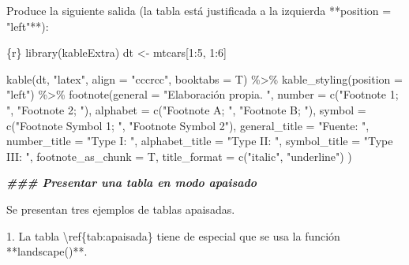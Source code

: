 \documentclass[11pt,a4paper,oneside,]{article}
\newenvironment{Shaded}{\begin{snugshade}}{\end{snugshade}}
\newcommand{\AttributeTok}[1]{\textcolor[rgb]{0.77,0.63,0.00}{#1}}
\newcommand{\DocumentationTok}[1]{\textcolor[rgb]{0.56,0.35,0.01}{\textbf{\textit{#1}}}}
\newcommand{\FloatTok}[1]{\textcolor[rgb]{0.00,0.00,0.81}{#1}}
\newcommand{\FunctionTok}[1]{\textcolor[rgb]{0.00,0.00,0.00}{#1}}
\newcommand{\NormalTok}[1]{#1}
\newcommand{\SpecialCharTok}[1]{\textcolor[rgb]{0.00,0.00,0.00}{#1}}
\newcommand{\StringTok}[1]{\textcolor[rgb]{0.31,0.60,0.02}{#1}}
\numberwithin{dummy}{section}
\theoremstyle{ocrenumbox}
\theoremstyle{blacknumex}
\theoremstyle{blacknumbox}
\theoremstyle{ocrenum}
\theoremstyle{ocrenum}
\begin{document}
\begin{Shaded}
\begin{Highlighting}[numbers=left,,]
\StringTok{\textasciigrave{}\textasciigrave{}\textasciigrave{}\textasciigrave{}}

\NormalTok{Produce la siguiente }\FunctionTok{salida}\NormalTok{ (la tabla está justificada a la izquierda }\SpecialCharTok{**}\StringTok{\textasciigrave{}}\AttributeTok{position = "left"}\StringTok{\textasciigrave{}}\SpecialCharTok{**}\NormalTok{)}\SpecialCharTok{:}

\StringTok{\textasciigrave{}\textasciigrave{}\textasciigrave{}}\AttributeTok{\{r\}}
\AttributeTok{library(kableExtra)}
\AttributeTok{dt \textless{}{-} mtcars[1:5, 1:6]}

\AttributeTok{kable(dt, "latex", align = "cccrcc", booktabs = T) \%\textgreater{}\%}
\AttributeTok{    kable\_styling(position = "left") \%\textgreater{}\% }
\AttributeTok{    footnote(general = "Elaboración propia. ",}
\AttributeTok{             number = c("Footnote 1; ", "Footnote 2; "),}
\AttributeTok{             alphabet = c("Footnote A; ", "Footnote B; "),}
\AttributeTok{             symbol = c("Footnote Symbol 1; ", "Footnote Symbol 2"), }
\AttributeTok{             general\_title = "Fuente: ", }
\AttributeTok{             number\_title = "Type I: ", }
\AttributeTok{             alphabet\_title = "Type II: ", }
\AttributeTok{             symbol\_title = "Type III: ", }
\AttributeTok{             footnote\_as\_chunk = T, }
\AttributeTok{             title\_format = c("italic", "underline") )}
\StringTok{\textasciigrave{}\textasciigrave{}\textasciigrave{}}


\DocumentationTok{\#\#\# Presentar una tabla en modo apaisado}

\NormalTok{Se presentan tres ejemplos de tablas apaisadas.}

\FloatTok{1.}\NormalTok{ La tabla \textbackslash{}ref\{tab}\SpecialCharTok{:}\NormalTok{apaisada\} tiene de especial que se usa la función }\SpecialCharTok{**}\StringTok{\textasciigrave{}}\AttributeTok{landscape()}\StringTok{\textasciigrave{}}\SpecialCharTok{**}\NormalTok{.}


\end{Highlighting}
\end{Shaded}
\end{document}
